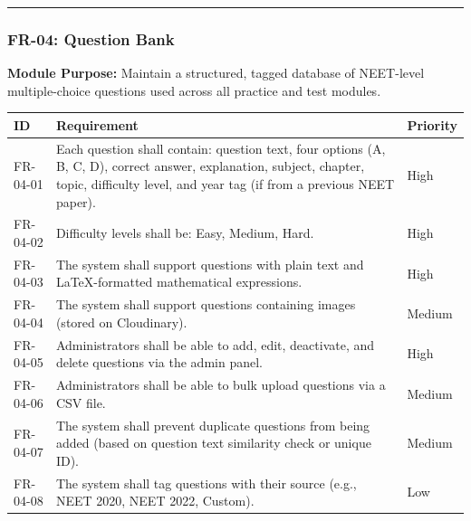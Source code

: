 \documentclass[
]{article}
\begin{document}
\begin{center}\rule{0.5\linewidth}{0.5pt}\end{center}

\subsubsection{FR-04: Question Bank}\label{fr-04-question-bank}

\textbf{Module Purpose:} Maintain a structured, tagged database of
NEET-level multiple-choice questions used across all practice and test
modules.

\begin{longtable}[]{@{}
  >{\raggedright\arraybackslash}p{}
  >{\raggedright\arraybackslash}p{}
  >{\raggedright\arraybackslash}p{}@{}}
\toprule\noalign{}
\begin{minipage}[b]{\linewidth}\raggedright
ID
\end{minipage} & \begin{minipage}[b]{\linewidth}\raggedright
Requirement
\end{minipage} & \begin{minipage}[b]{\linewidth}\raggedright
Priority
\end{minipage} \\
\midrule\noalign{}
\endhead
\bottomrule\noalign{}
\endlastfoot
FR-04-01 & Each question shall contain: question text, four options (A,
B, C, D), correct answer, explanation, subject, chapter, topic,
difficulty level, and year tag (if from a previous NEET paper). &
High \\
FR-04-02 & Difficulty levels shall be: Easy, Medium, Hard. & High \\
FR-04-03 & The system shall support questions with plain text and
LaTeX-formatted mathematical expressions. & High \\
FR-04-04 & The system shall support questions containing images (stored
on Cloudinary). & Medium \\
FR-04-05 & Administrators shall be able to add, edit, deactivate, and
delete questions via the admin panel. & High \\
FR-04-06 & Administrators shall be able to bulk upload questions via a
CSV file. & Medium \\
FR-04-07 & The system shall prevent duplicate questions from being added
(based on question text similarity check or unique ID). & Medium \\
FR-04-08 & The system shall tag questions with their source (e.g., NEET
2020, NEET 2022, Custom). & Low \\
\end{longtable}
\end{document}
